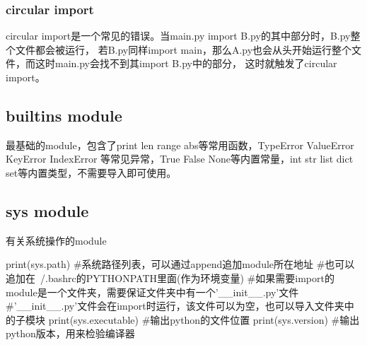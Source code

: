     \subsubsection{circular import}
      circular import是一个常见的错误。当main.py import B.py的其中部分时，B.py整个文件都会被运行，
      若B.py同样import main，那么A.py也会从头开始运行整个文件，而这时main.py会找不到其import B.py中的部分，
      这时就触发了circular import。

  \subsection{builtins module}
    最基础的module，包含了print len range abs等常用函数，TypeError ValueError KeyError IndexError
    等常见异常，True False None等内置常量，int str list dict set等内置类型，不需要导入即可使用。

  \subsection{sys module}
    有关系统操作的module
    \begin{codeblock}[language=python, caption={sys module}]
      print(sys.path)
      #系统路径列表，可以通过append追加module所在地址
      #也可以追加在~/.bashrc的PYTHONPATH里面(作为环境变量)
      #如果需要import的module是一个文件夹，需要保证文件夹中有一个'\_\_init\_\_.py'文件
      #'\_\_init\_\_.py'文件会在import时运行，该文件可以为空，也可以导入文件夹中的子模块
      print(sys.executable) #输出python的文件位置
      print(sys.version) #输出python版本，用来检验编译器
    \end{codeblock}

